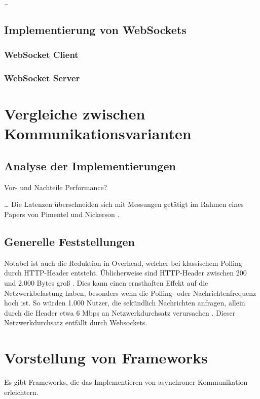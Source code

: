 \documentclass[sigplan, screen]{acmart}
\begin{document}
\dots

\subsection{Implementierung von WebSockets}

\subsubsection{WebSocket Client}

\subsubsection{WebSocket Server}

\section{Vergleiche zwischen Kommunikationsvarianten}


\subsection{Analyse der Implementierungen}

Vor- und Nachteile
Performance?

… Die Latenzen überschneiden sich mit Messungen getätigt im Rahmen eines Papers von Pimentel und Nickerson \cite{pimentel_communicating_2012}.

\subsection{Generelle Feststellungen}

Notabel ist auch die Reduktion in Overhead, welcher bei klassischem Polling durch HTTP-Header entsteht. 
Üblicherweise sind HTTP-Header zwischen 200 und 2.000 Bytes groß \cite{noauthor_spdy_nodate}.
Dies kann einen ernsthaften Effekt auf die Netzwerkbelastung haben, besonders wenn die Polling- oder Nachrichtenfrequenz hoch ist.
So würden 1.000 Nutzer, die sekündlich Nachrichten anfragen, allein durch die Header etwa 6 Mbps an Netzwerkdurchsatz verursachen \cite{lubbers_html5_nodate}.
Dieser Netzwerkdurchsatz entfällt durch Websockets.

\section{Vorstellung von Frameworks}

Es gibt Frameworks, die das Implementieren von asynchroner Kommunikation erleichtern.
\end{document}
